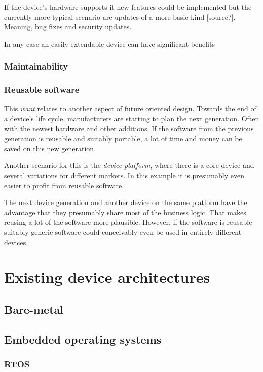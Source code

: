 If the device's hardware supports it new features could be implemented but the currently more typical scenario are updates of a more basic kind [source?]. Meaning, bug fixes and security updates.

In any case an easily extendable device can have significant benefits
\subsubsection{Maintainability}
\subsubsection{Reusable software}
This \textit{want} relates to another aspect of future oriented design. Towards the end of a device's life cycle, manufacturers are starting to plan the next generation. Often with the newest hardware and other additions. If the software from the previous generation is reusable and suitably portable, a lot of time and money can be saved on this new generation.

Another scenario for this is the \textit{device platform}, where there is a core device and several variations for different markets. In this example it is presumably even easier to profit from reusable software.

The next device generation and another device on the same platform have the advantage that they presumably share most of the business logic. That makes reusing a lot of the software more plausible. However, if the software is reusable suitably generic software could conceivably even be used in entirely different devices.

\section{Existing device architectures}
\subsection{Bare-metal}
\subsection{Embedded operating systems}
\subsubsection{RTOS}
